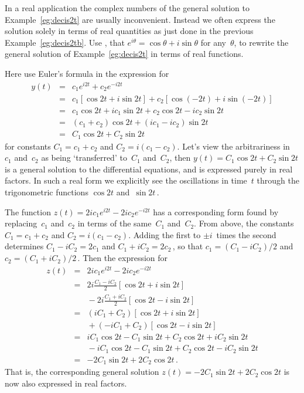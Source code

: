 \begin{example} \label{eg:realcis}
In a real application the complex numbers of the general solution to Example~\ref{eg:decis2t} are usually inconvenient.  
Instead we often express the solution solely in terms of real quantities as just done in the previous Example~\ref{eg:decis2tb}.
Use , that \(e^{i\theta}=\cos\theta+i\sin\theta\) for any~\(\theta\), to rewrite the general solution of Example~\ref{eg:decis2t} in terms of real functions.
\begin{solution}
Here use Euler's formula in the expression for
\begin{eqnarray*}
y(t)&=&c_1e^{i2t}+c_2e^{-i2t}
\\&=&c_1[\cos 2t+i\sin2t]+c_2[\cos(-2t)+i\sin(-2t)]
\\&=&c_1\cos2t+ic_1\sin2t +c_2\cos2t-ic_2\sin2t
\\&=&(c_1+c_2)\cos2t +(ic_1-ic_2)\sin2t
\\&=&C_1\cos2t+C_2\sin2t
\end{eqnarray*}
for constants \(C_1=c_1+c_2\) and \(C_2=i(c_1-c_2)\).
Let's view the arbitrariness in~\(c_1\) and~\(c_2\) as being `transferred' to~\(C_1\) and~\(C_2\), then \(y(t)=C_1\cos2t+C_2\sin2t\) is a general solution to the differential equations, and is expressed purely in real factors.
In such a real form we explicitly see the oscillations in time~\(t\) through the trigonometric functions \(\cos 2t\) and~\(\sin2t\)\,.

The function \(z(t)=2ic_1e^{i2t}-2ic_2e^{-i2t}\) has a corresponding form found by replacing~\(c_1\) and~\(c_2\) in terms of the same~\(C_1\) and~\(C_2\).
From above, the constants \(C_1=c_1+c_2\) and \(C_2=i(c_1-c_2)\).
Adding the first to \(\pm i\)~times the second determines \(C_1-iC_2=2c_1\) and \(C_1+iC_2=2c_2\)\,, so that \(c_1=(C_1-iC_2)/2\) and \(c_2=(C_1+iC_2)/2\)\,.  
Then the expression for
\begin{eqnarray*}
z(t)&=&2ic_1e^{i2t}-2ic_2e^{-i2t}
\\&=&2i\frac{C_1-iC_2}2[\cos2t+i\sin2t]
\\&&{}
-2i\frac{C_1+iC_2}2[\cos2t-i\sin2t]
\\&=&(iC_1+C_2)[\cos2t+i\sin2t]
\\&&{}
+(-iC_1+C_2)[\cos2t-i\sin2t]
\\&=&iC_1\cos2t-C_1\sin2t+C_2\cos2t+iC_2\sin2t
\\&&{}
-iC_1\cos2t-C_1\sin2t+C_2\cos2t-iC_2\sin2t
\\&=&-2C_1\sin2t+2C_2\cos2t\,.
\end{eqnarray*}
That is, the corresponding general solution \(z(t)=-2C_1\sin2t+2C_2\cos2t\) is now also expressed in real factors.
\end{solution}
\end{example}




